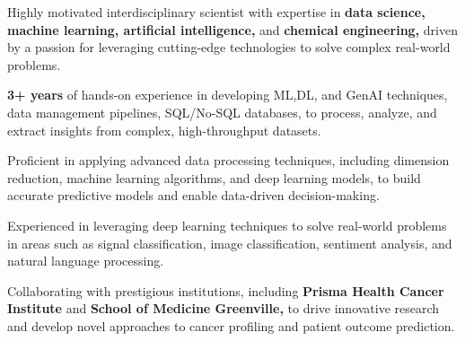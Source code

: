 

\begin{cvparagraph}
    \vspace{0.5cm}
    \begin{cvitemsfree}
        \item{Highly motivated interdisciplinary scientist with expertise in \textbf{data science, machine learning, artificial intelligence,} and \textbf{chemical engineering,} driven by a passion for leveraging cutting-edge technologies to solve complex real-world problems.}
        \item{\textbf{3+ years} of hands-on experience in developing ML,DL, and GenAI techniques, data management pipelines, SQL/No-SQL databases,  to process, analyze, and extract insights from complex, high-throughput datasets.}
        \item{Proficient in applying advanced data processing techniques, including dimension reduction, machine learning algorithms, and deep learning models, to build accurate predictive models and enable data-driven decision-making.}
        \item{Experienced in leveraging deep learning techniques to solve real-world problems in areas such as signal classification, image classification, sentiment analysis, and natural language processing.}
        \item{Collaborating with prestigious institutions, including \textbf{Prisma Health Cancer Institute} and \textbf{School of Medicine Greenville,} to drive innovative research and develop novel approaches to cancer profiling and patient outcome prediction.}
    \end{cvitemsfree}


\end{cvparagraph}
